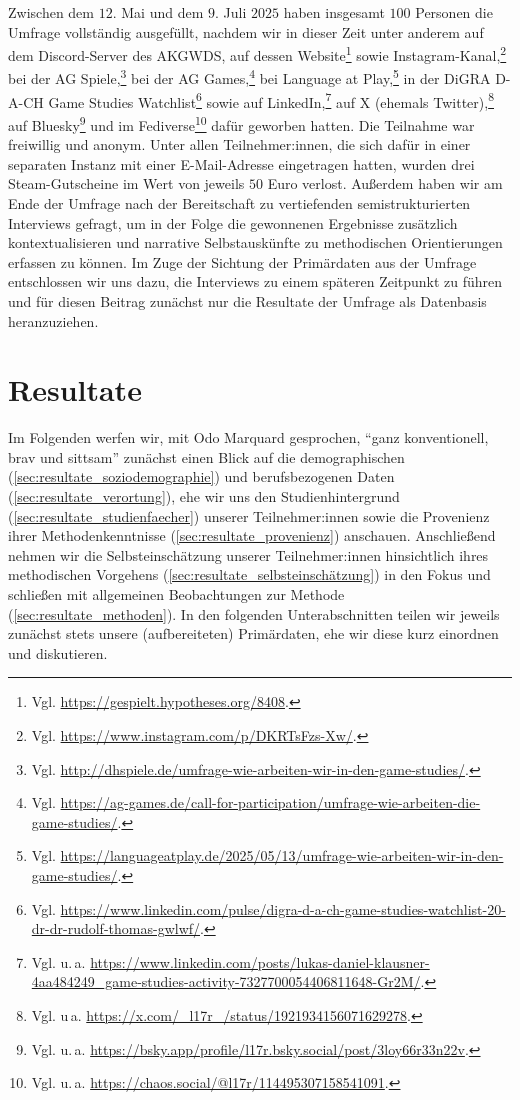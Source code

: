 \documentclass{scrartcl}
\begin{document}
Zwischen dem $12.$ Mai und dem $9.$ Juli $2025$ haben insgesamt $100$ Personen die Umfrage vollständig ausgefüllt, nachdem wir in dieser Zeit unter anderem auf dem Discord-Server des AKGWDS, auf dessen Website\footnote{Vgl. \url{https://gespielt.hypotheses.org/8408}.} sowie Instagram-Kanal,\footnote{Vgl. \url{https://www.instagram.com/p/DKRTsFzs-Xw/}.} bei der AG Spiele,\footnote{Vgl. \url{http://dhspiele.de/umfrage-wie-arbeiten-wir-in-den-game-studies/}.} bei der AG Games,\footnote{Vgl. \url{https://ag-games.de/call-for-participation/umfrage-wie-arbeiten-die-game-studies/}.} bei Language at Play,\footnote{Vgl. \url{https://languageatplay.de/2025/05/13/umfrage-wie-arbeiten-wir-in-den-game-studies/}.} in der DiGRA D-A-CH Game Studies Watchlist\footnote{Vgl. \url{https://www.linkedin.com/pulse/digra-d-a-ch-game-studies-watchlist-20-dr-dr-rudolf-thomas-gwlwf/}.} sowie auf LinkedIn,\footnote{Vgl. u.\,a. \url{https://www.linkedin.com/posts/lukas-daniel-klausner-4aa484249_game-studies-activity-7327700054406811648-Gr2M/}.} auf X (ehemals Twitter),\footnote{Vgl. u\,a. \url{https://x.com/_l17r_/status/1921934156071629278}.} auf Bluesky\footnote{Vgl. u.\,a. \url{https://bsky.app/profile/l17r.bsky.social/post/3loy66r33n22v}.} und im Fediverse\footnote{Vgl. u.\,a. \url{https://chaos.social/@l17r/114495307158541091}.} dafür geworben hatten.
Die Teilnahme war freiwillig und anonym.
Unter allen Teilnehmer:innen, die sich dafür in einer separaten Instanz mit einer E-Mail-Adresse eingetragen hatten, wurden drei Steam-Gutscheine im Wert von jeweils $50$ Euro verlost.
Außerdem haben wir am Ende der Umfrage nach der Bereitschaft zu vertiefenden semistrukturierten Interviews gefragt, um in der Folge die gewonnenen Ergebnisse zusätzlich kontextualisieren und narrative Selbstauskünfte zu methodischen Orientierungen erfassen zu können.
Im Zuge der Sichtung der Primärdaten aus der Umfrage entschlossen wir uns dazu, die Interviews zu einem späteren Zeitpunkt zu führen und für diesen Beitrag zunächst nur die Resultate der Umfrage als Datenbasis heranzuziehen.


\section{Resultate}\label{sec:resultate}
Im Folgenden werfen wir, mit Odo Marquard gesprochen, \enquote{ganz konventionell, brav und sittsam}\autocite[][S.~33]{marquard_zur_1986} zunächst einen Blick auf die demographischen (\autoref{sec:resultate_soziodemographie}) und berufsbezogenen Daten (\autoref{sec:resultate_verortung}), ehe wir uns den Studienhintergrund (\autoref{sec:resultate_studienfaecher}) unserer Teilnehmer:innen sowie die Provenienz ihrer Methodenkenntnisse (\autoref{sec:resultate_provenienz}) anschauen.
Anschließend nehmen wir die Selbsteinschätzung unserer Teilnehmer:innen hinsichtlich ihres methodischen Vorgehens (\autoref{sec:resultate_selbsteinschätzung}) in den Fokus und schließen mit allgemeinen Beobachtungen zur Methode (\autoref{sec:resultate_methoden}).
In den folgenden Unterabschnitten teilen wir jeweils zunächst stets unsere (aufbereiteten) Primärdaten, ehe wir diese kurz einordnen und diskutieren.
\end{document}
